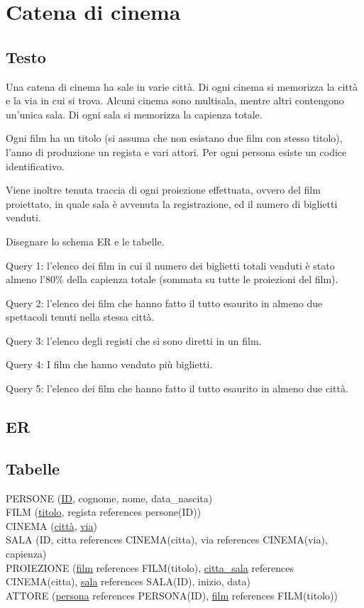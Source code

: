 \documentclass[11pt]{article}
\begin{document}
\newpage
\section{Catena di cinema}

\subsection{Testo}

Una catena di cinema ha sale in varie citt\`a. Di ogni cinema si memorizza la
citt\`a e la via in cui si trova. Alcuni cinema sono multisala, mentre altri
contengono un'unica sala. Di ogni sala si memorizza la capienza totale.

Ogni film ha un titolo (si assuma che non esistano due film con stesso titolo),
l'anno di produzione
un regista e vari attori. Per ogni persona esiste un codice identificativo.

Viene inoltre tenuta traccia di ogni proiezione effettuata, ovvero del film
proiettato, in quale sala \`e avvenuta la registrazione, ed il numero di biglietti
venduti.

Disegnare lo schema ER e le tabelle.

Query 1: l'elenco dei film in cui il numero dei biglietti totali venduti \`e stato almeno
l'80\% della capienza totale (sommata su tutte le proiezioni del film).

Query 2: l'elenco dei film che hanno fatto il tutto esaurito in almeno due
spettacoli tenuti nella stessa citt\`a.

Query 3: l'elenco degli registi che si sono diretti in un film.

Query 4: I film che hanno venduto pi\`u biglietti.

Query 5: l'elenco dei film che hanno fatto il tutto esaurito in almeno due citt\`a.
\subsection{ER}
\begin{center}

\end{center}

\subsection{Tabelle}
\noindent
PERSONE (\underline{ID}, cognome, nome, data\_nascita)\\
FILM (\underline{titolo}, regista references persone(ID))\\
CINEMA (\underline{citt\`a}, \underline{via})\\
SALA (ID, citta references CINEMA(citta), via references
CINEMA(via), capienza)\\
PROIEZIONE (\underline{film}  references FILM(titolo), \underline{citta\_sala}
references CINEMA(citta), \underline{sala} references SALA(ID), inizio, data)\\
ATTORE (\underline{persona}   references PERSONA(ID), \underline{film}   references
FILM(titolo))
\end{document}

